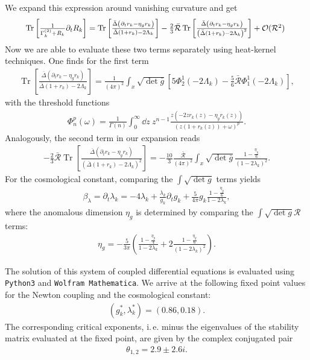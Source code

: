 We expand this expression around vanishing curvature and get
\begin{align}
\resizebox{.9 \textwidth}{!}{$
\operatorname{Tr}\left[\frac{1}{\Gammak^{(2)} + R_k}\partial_t R_k\right] = \operatorname{Tr}\left[\frac{\bar{\Delta}\left(\partial_t r_k - \eta_g r_k\right)}{\bar{\Delta}(1+r_k)-2\Lambda_k}\right] - \frac{2}{3}\bar{\mathcal{R}}\operatorname{Tr}\left[\frac{\bar{\Delta}\left(\partial_t r_k - \eta_g r_k\right)}{\left(\bar{\Delta}(1+r_k)-2\Lambda_k\right)^2}\right] + \mathcal{O}(\mathcal{R}^2)$
}
\end{align}
Now we are able to evaluate these two terms separately using heat-kernel techniques. One finds for the first term
\begin{align}
\operatorname{Tr}\left[\frac{\bar{\Delta}\left(\partial_t r_k - \eta_g r_k\right)}{\bar{\Delta}(1+r_k)-2\Lambda_k}\right] = \frac{1}{(4\pi)^2}\int_x \sqrt{\operatorname{det}\bar{g}} \left[5\Phi_2^1(-2\Lambda_k) - \frac{5}{6}\bar{\mathcal{R}}\Phi^1_1(-2\Lambda_k)\right],
\end{align}
with the threshold functions 
\begin{align}
	\Phi_n^p(\omega) = \frac{1}{\Gamma(n)}\int_0^{\infty}\dd z \ z^{n-1} \frac{z(-2zr_k(z)-\eta_gr_k(z))}{(z(1+r_k(z))+\omega)^p}.
\end{align}
Analogously, the second term in our expansion reads
\begin{align}
	-\frac{2}{3}\bar{\mathcal{R}}\operatorname{Tr}\left[\frac{\bar{\Delta}\left(\partial_t r_k - \eta_g r_k\right)}{\left(\bar{\Delta}(1+r_k)-2\Lambda_k\right)^2}\right] = -\frac{10}{3}\frac{\bar{\mathcal{R}}}{(4\pi)^2}\int_x  \sqrt{\operatorname{det}\bar{g}} \frac{1-\frac{\eta_g}{6}}{(1-2\lambda_k)^2}.
\end{align}
For the cosmological constant, comparing the $\int\sqrt{\operatorname{det}g}$ terms yields
\begin{align}
	\beta_{\lambda} = \partial_t\lambda_k = -4\lambda_k + \frac{\lambda_k}{g_k} \partial_t g_k + \frac{5}{4\pi}g_k\frac{1-\frac{\eta_g}{6}}{1-2\lambda_k},
\end{align}
where the anomalous dimension $\eta_g$ is determined by comparing the $\int\sqrt{\operatorname{det}g}\mathcal{R}$ terms:
\begin{align}
\eta_g = -\frac{5}{3\pi} \left(\frac{1-\frac{\eta_g}{4}}{1-2\lambda_k} + 2\frac{1-\frac{\eta_g}{6}}{(1-2\lambda_k)^2}\right).	
\end{align}

The solution of this system of coupled differential equations is evaluated using \verb|Python3| and \verb|Wolfram Mathematica|. We arrive at the following fixed point values for the Newton coupling and the cosmological constant:
\begin{align}
	(g_k^*, \lambda_k^*) = (0.86, 0.18).
\end{align}
The corresponding critical exponents, i.\,e. minus the eigenvalues of the stability matrix evaluated at the fixed point, are given by the complex conjugated pair
\begin{align}
	\theta_{1,2} = 2.9 \pm 2.6i. 
\end{align}

